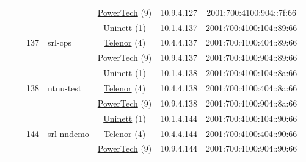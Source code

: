 \begin{small}
\begin{center}
\begin{longtable}{|c|c|c|c|c|c|c|c|}
  &  &  &  & \multicolumn{2}{|c|}{\tiny{\href{http://www.powertech.no}{PowerTech} (9)}} & \tiny{10.9.4.127} & \tiny{2001:700:4100:904::7f:66} \\* \cline{3-3}\cline{4-4}\cline{5-5}\cline{6-6}\cline{7-7}\cline{8-8}
  &  & \multirow{3}{*}{\tiny{137}} & \multicolumn{1}{|l|}{\multirow{3}{*}{\tiny{srl-cps}}} & \multicolumn{2}{|c|}{\tiny{\href{https://www.uninett.no}{Uninett} (1)}} & \tiny{10.1.4.137} & \tiny{2001:700:4100:104::89:66} \\* \cline{5-5}\cline{6-6}\cline{7-7}\cline{8-8}
  &  &  &  & \multicolumn{2}{|c|}{\tiny{\href{https://www.telenor.no}{Telenor} (4)}} & \tiny{10.4.4.137} & \tiny{2001:700:4100:404::89:66} \\* \cline{5-5}\cline{6-6}\cline{7-7}\cline{8-8}
  &  &  &  & \multicolumn{2}{|c|}{\tiny{\href{http://www.powertech.no}{PowerTech} (9)}} & \tiny{10.9.4.137} & \tiny{2001:700:4100:904::89:66} \\* \cline{3-3}\cline{4-4}\cline{5-5}\cline{6-6}\cline{7-7}\cline{8-8}
  &  & \multirow{3}{*}{\tiny{138}} & \multicolumn{1}{|l|}{\multirow{3}{*}{\tiny{ntnu-test}}} & \multicolumn{2}{|c|}{\tiny{\href{https://www.uninett.no}{Uninett} (1)}} & \tiny{10.1.4.138} & \tiny{2001:700:4100:104::8a:66} \\* \cline{5-5}\cline{6-6}\cline{7-7}\cline{8-8}
  &  &  &  & \multicolumn{2}{|c|}{\tiny{\href{https://www.telenor.no}{Telenor} (4)}} & \tiny{10.4.4.138} & \tiny{2001:700:4100:404::8a:66} \\* \cline{5-5}\cline{6-6}\cline{7-7}\cline{8-8}
  &  &  &  & \multicolumn{2}{|c|}{\tiny{\href{http://www.powertech.no}{PowerTech} (9)}} & \tiny{10.9.4.138} & \tiny{2001:700:4100:904::8a:66} \\* \cline{3-3}\cline{4-4}\cline{5-5}\cline{6-6}\cline{7-7}\cline{8-8}
  &  & \multirow{3}{*}{\tiny{144}} & \multicolumn{1}{|l|}{\multirow{3}{*}{\tiny{srl-nndemo}}} & \multicolumn{2}{|c|}{\tiny{\href{https://www.uninett.no}{Uninett} (1)}} & \tiny{10.1.4.144} & \tiny{2001:700:4100:104::90:66} \\* \cline{5-5}\cline{6-6}\cline{7-7}\cline{8-8}
  &  &  &  & \multicolumn{2}{|c|}{\tiny{\href{https://www.telenor.no}{Telenor} (4)}} & \tiny{10.4.4.144} & \tiny{2001:700:4100:404::90:66} \\* \cline{5-5}\cline{6-6}\cline{7-7}\cline{8-8}
  &  &  &  & \multicolumn{2}{|c|}{\tiny{\href{http://www.powertech.no}{PowerTech} (9)}} & \tiny{10.9.4.144} & \tiny{2001:700:4100:904::90:66} \\* \cline{3-3}\cline{4-4}\cline{5-5}\cline{6-6}\cline{7-7}\cline{8-8}

\end{longtable}
\end{center}
\end{small}
